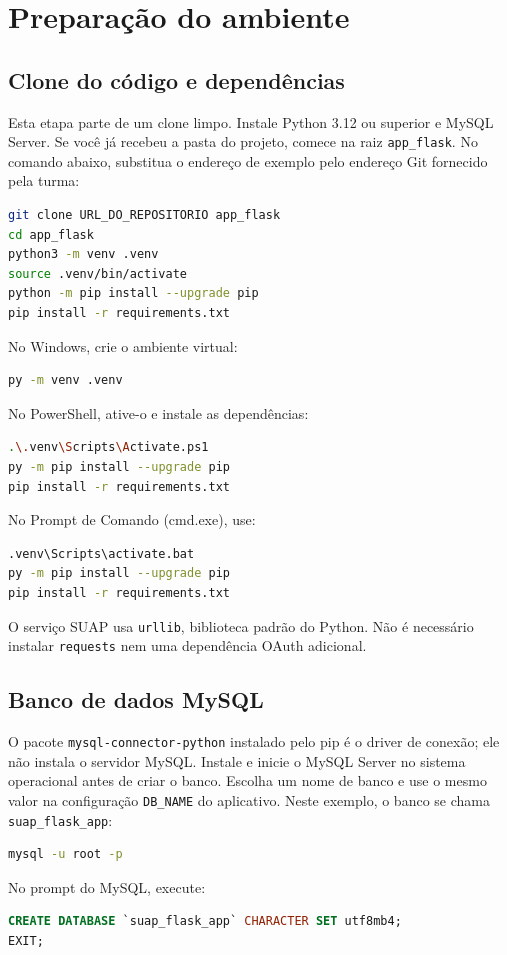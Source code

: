 \documentclass[11pt,a4paper]{article}
\begin{document}
\clearpage
\section{Preparação do ambiente}
\subsection{Clone do código e dependências}
Esta etapa parte de um clone limpo. Instale Python 3.12 ou superior e MySQL Server. Se você já recebeu a pasta do projeto, comece na raiz \texttt{app\_flask}. No comando abaixo, substitua o endereço de exemplo pelo endereço Git fornecido pela turma:
\begin{lstlisting}[language=bash]
git clone URL_DO_REPOSITORIO app_flask
cd app_flask
python3 -m venv .venv
source .venv/bin/activate
python -m pip install --upgrade pip
pip install -r requirements.txt
\end{lstlisting}
No Windows, crie o ambiente virtual:
\begin{lstlisting}[language=bash]
py -m venv .venv
\end{lstlisting}
No PowerShell, ative-o e instale as dependências:
\begin{lstlisting}[language=bash]
.\.venv\Scripts\Activate.ps1
py -m pip install --upgrade pip
pip install -r requirements.txt
\end{lstlisting}
No Prompt de Comando (cmd.exe), use:
\begin{lstlisting}[language=bash]
.venv\Scripts\activate.bat
py -m pip install --upgrade pip
pip install -r requirements.txt
\end{lstlisting}
O serviço SUAP usa \texttt{urllib}, biblioteca padrão do Python. Não é necessário instalar \texttt{requests} nem uma dependência OAuth adicional.

\subsection{Banco de dados MySQL}
O pacote \texttt{mysql-connector-python} instalado pelo pip é o driver de conexão; ele não instala o servidor MySQL. Instale e inicie o MySQL Server no sistema operacional antes de criar o banco. Escolha um nome de banco e use o mesmo valor na configuração \texttt{DB\_NAME} do aplicativo. Neste exemplo, o banco se chama \texttt{suap\_flask\_app}:
\begin{lstlisting}[language=bash]
mysql -u root -p
\end{lstlisting}
No prompt do MySQL, execute:
\begin{lstlisting}[language=SQL]
CREATE DATABASE `suap_flask_app` CHARACTER SET utf8mb4;
EXIT;
\end{lstlisting}
\end{document}

